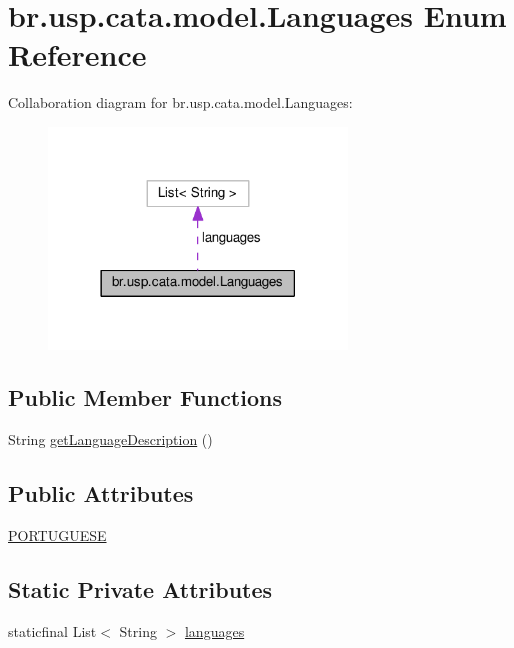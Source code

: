 \hypertarget{enumbr_1_1usp_1_1cata_1_1model_1_1_languages}{\section{br.\+usp.\+cata.\+model.\+Languages Enum Reference}
\label{enumbr_1_1usp_1_1cata_1_1model_1_1_languages}
}


Collaboration diagram for br.\+usp.\+cata.\+model.\+Languages\+:\nopagebreak
\begin{figure}[H]
\begin{center}
\leavevmode
\includegraphics[width=225pt]{enumbr_1_1usp_1_1cata_1_1model_1_1_languages__coll__graph}
\end{center}
\end{figure}
\subsection*{Public Member Functions}
\begin{DoxyCompactItemize}
\item 
String \hyperlink{enumbr_1_1usp_1_1cata_1_1model_1_1_languages_acd4a911ab7aba44a28568fe155b298fb}{get\+Language\+Description} ()
\end{DoxyCompactItemize}
\subsection*{Public Attributes}
\begin{DoxyCompactItemize}
\item 
\hyperlink{enumbr_1_1usp_1_1cata_1_1model_1_1_languages_a836bacc47bbba846ef6a9e1885bc3e2c}{P\+O\+R\+T\+U\+G\+U\+E\+S\+E}
\end{DoxyCompactItemize}
\subsection*{Static Private Attributes}
\begin{DoxyCompactItemize}
\item 
staticfinal List$<$ String $>$ \hyperlink{enumbr_1_1usp_1_1cata_1_1model_1_1_languages_a3b463807dd4fa147b92c2fd936a074b5}{languages}
\end{DoxyCompactItemize}


